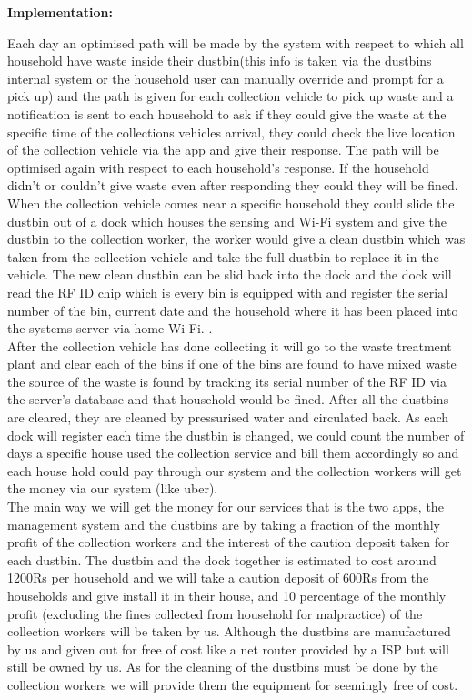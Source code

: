 
\textbf{\textup{\huge {\bf Implementation: } \\[0.20in] }}

\normalsize { Each day an optimised path will be made by the system with respect to which all household have waste inside their dustbin(this info is taken via the dustbins internal system or the household user can manually override and prompt for a pick up) and the path is given for each collection vehicle to pick up waste and a notification is sent to each household to ask if they could give the waste at the specific time of the collections vehicles arrival, they could check the live location of the collection vehicle via the app and give their response. The path will be optimised again with respect to each household’s response. If the household didn’t or couldn’t give waste even after responding they could they will be fined.}\\[0.1in] 
\normalsize { 	When the collection vehicle comes near a specific household they could slide the dustbin out of a dock which houses the sensing and Wi-Fi system and give the dustbin to the collection worker, the worker would give a clean dustbin which was taken from the collection vehicle and take the full dustbin to replace it in the vehicle. The new clean dustbin can be slid back into the dock and the dock will read the RF ID chip which is every bin is equipped with and register the serial number of the bin, current date and the household where it has been placed into the systems server via home Wi-Fi. 
	. }\\[0.1in]
\normalsize {After the collection vehicle has done collecting it will go to the waste treatment plant and clear each of the bins if one of the bins are found to have mixed waste the source of the waste is found by tracking its serial number of the RF ID via the server’s database and that household would be fined. After all the dustbins are cleared, they are cleaned by pressurised water and circulated back. As each dock will register each time the dustbin is changed, we could count the number of days a specific house used the collection service and bill them accordingly so and each house hold could pay through our system and the collection workers will get the money via our system (like uber).}\\[0.01in]
\normalsize {The main way we will get the money for our services that is the two apps, the management system and the dustbins are by taking a fraction of the monthly profit of the collection workers and the interest of the caution deposit taken for each dustbin. The dustbin and the dock together is estimated to cost around 1200Rs per household and we will take a caution deposit of 600Rs from the households and give install it in their house, and 10 percentage of the monthly profit (excluding the fines collected from household for malpractice) of the collection workers will be taken by us. Although the dustbins are manufactured by us and given out for free of cost like a net router provided by a ISP but will still be owned by us. As for the cleaning of the dustbins must be done by the collection workers we will provide them the equipment for seemingly free of cost.
}\\[0.1in]

